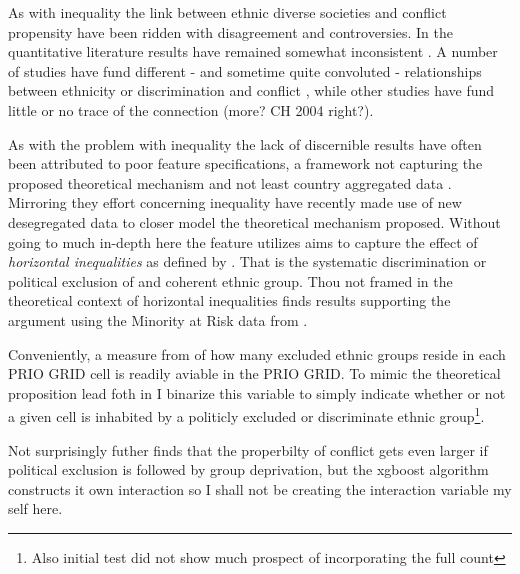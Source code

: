 \documentclass[a4paper]{article}
\begin{document}
As with inequality the link between ethnic diverse societies and conflict propensity have been ridden with disagreement and controversies. In the quantitative literature results have remained somewhat inconsistent \citep[23-24]{Blattman_Miguel_2010}. A number of studies have fund different - and sometime quite convoluted - relationships between ethnicity or discrimination and conflict \citep{Collier_Hoeffler_1998, Fearon_2004, Blimes_2006, Hegre_Sambanis_2006, Goldstone_2010}, while other studies have fund little or no trace of the connection \citep{Fearon_Laitin_2003, Collier_Hoeffler_2004}(more? CH 2004 right?).\par 

As with the problem with inequality the lack of discernible results have often been attributed to poor feature specifications, a framework not capturing the proposed theoretical mechanism and not least country aggregated data \citep{Blimes_2006, Blattman_Miguel_2010, Cederman_Gleditsch_Buhaug_2013}. Mirroring they effort concerning inequality \cite{Cederman_Gleditsch_Buhaug_2013} have recently made use of new desegregated data \citep{Girardin_2015} to closer model the theoretical mechanism proposed. Without going to much in-depth here the feature \cite{Cederman_Gleditsch_Buhaug_2013} utilizes aims to capture the effect of \emph{horizontal inequalities} as defined by \citep[31-35]{Cederman_Gleditsch_Buhaug_2013}. That is the systematic discrimination or political exclusion of and coherent ethnic group. Thou not framed in the theoretical context of horizontal inequalities \cite{Goldstone_2010} finds results supporting the argument using the Minority at Risk data from \cite{Gurr_1995}.\par

Conveniently, a measure from \cite{Girardin_2015} of how many excluded ethnic groups reside in each PRIO GRID cell is readily aviable in the PRIO GRID. To mimic the theoretical proposition lead foth in \cite{Cederman_Gleditsch_Buhaug_2013} I binarize this variable to simply indicate whether or not a given cell is inhabited by a politicly excluded or discriminate ethnic group\footnote{Also initial test did not show much prospect of incorporating the full count}. 

Not surprisingly \cite{Cederman_Gleditsch_Buhaug_2013} futher finds that the properbilty of conflict gets even larger if political exclusion is followed by group deprivation, but the xgboost algorithm constructs it own interaction so I shall not be creating the interaction variable my self here.
\end{document}

